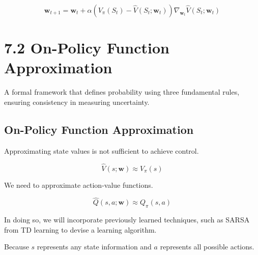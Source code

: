 \documentclass[
  letterpaper,
  DIV=11,
  numbers=noendperiod]{scrreprt}
\begin{document}
\[
\mathbf{w}_{t+1} = \mathbf{w}_{t} + \alpha(V_{\pi}(S_{t}) - \hat{V}(S_{t}; \mathbf{w}_{t}))\nabla_{\mathbf{w}_{t}} \hat{V}(S_{t}; \mathbf{w}_{t})
\]

\begin{tcolorbox}[enhanced jigsaw, toprule=.15mm, leftrule=.75mm, coltitle=black, left=2mm, opacityback=0, titlerule=0mm, arc=.35mm, toptitle=1mm, opacitybacktitle=0.6, bottomtitle=1mm, colframe=quarto-callout-tip-color-frame, title=\textcolor{quarto-callout-tip-color}{\faLightbulb}\hspace{0.5em}{Solution}, rightrule=.15mm, bottomrule=.15mm, colbacktitle=quarto-callout-tip-color!10!white, breakable, colback=white]

\end{tcolorbox}

\chapter{7.2 On-Policy Function
Approximation}\label{on-policy-function-approximation}

\begin{tcolorbox}[enhanced jigsaw, arc=.35mm, toprule=.15mm, leftrule=.75mm, colback=white, left=2mm, colframe=quarto-callout-note-color-frame, rightrule=.15mm, opacityback=0, breakable, bottomrule=.15mm]

A formal framework that defines probability using three fundamental
rules, ensuring consistency in measuring uncertainty. 🎲

\end{tcolorbox}

\section{On-Policy Function
Approximation}\label{on-policy-function-approximation-1}

Approximating state values is not sufficient to achieve control.

\[
\hat{V}(s; \mathbf{w}) \approx V_{\pi}(s)
\]

We need to approximate action-value functions.

\[
\hat{Q}(s,a; \mathbf{w}) \approx Q_{\pi}(s,a)
\]

In doing so, we will incorporate previously learned techniques, such as
SARSA from TD learning to devise a learning algorithm.

Because \(s\) represents any state information and \(a\) represents all
possible actions.
\end{document}
